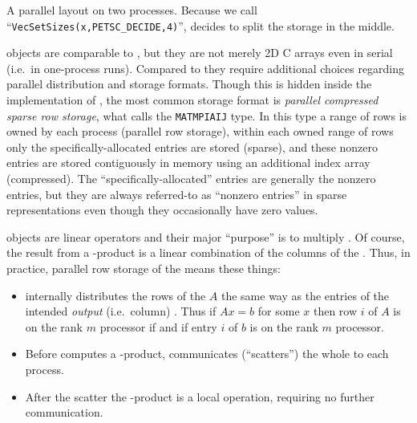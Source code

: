 \begin{marginfigure}
\bigskip
\caption{A parallel \pVec layout on two processes.  Because we call ``\texttt{VecSetSizes(x,PETSC\_DECIDE,4)}'', \PETSc decides to split the storage in the middle.}
\label{fig:mpitwoveclayout}
\end{marginfigure}

\PETSc \pMat objects are comparable to \pVecs, but they are not merely 2D C arrays even in serial (i.e.~in one-process runs).  Compared to \pVecs they require additional choices regarding parallel distribution and storage formats.  Though this is hidden inside the implementation of \pMat, the most common storage format is \emph{parallel compressed sparse row storage}, what \PETSc calls the \texttt{MATMPIAIJ} type.  In this type a range of rows is owned by each process (parallel row storage), within each owned range of rows only the specifically-allocated entries are stored (sparse), and these nonzero entries are stored contiguously in memory using an additional index array (compressed).  The ``specifically-allocated'' entries are generally the nonzero entries, but they are always referred-to as ``nonzero entries'' in sparse representations even though they occasionally have zero values.

\pMat objects are linear operators and their major ``purpose'' is to multiply \pVecs.  Of course, the result \pVec from a \pMat-\pVec product is a linear combination of the columns of the \pMat.  Thus, in practice, parallel row storage of the \pMat means these things:
\begin{itemize}
\item \PETSc internally distributes the rows of the \pMat $A$ the same way as the entries of the intended \emph{output} (i.e.~column) \pVec.  Thus if $Ax=b$ for some $x$ then row $i$ of $A$ is on the rank $m$ processor if and if entry $i$ of $b$ is on the rank $m$ processor.
\item Before \PETSc computes a \pMat-\pVec product, \PETSc communicates (``scatters'') the whole \pVec to each process.
\item After the scatter the \pMat-\pVec product is a local operation, requiring no further communication.
\end{itemize}

